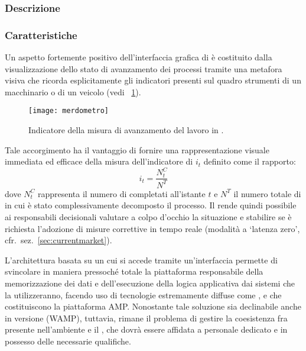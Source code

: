 \subsubsection{Descrizione}

\subsubsection{Caratteristiche}
Un aspetto fortemente positivo dell'interfaccia grafica di \progname è costituito dalla visualizzazione dello stato di avanzamento dei processi tramite una metafora visiva che ricorda esplicitamente gli indicatori presenti sul quadro strumenti di un macchinario o di un veicolo (vedi \figurename~\ref{fig:merdometro}).

\begin{figure}[H]
  \centering
  \texttt{[image: merdometro]}
  \caption{Indicatore della misura di avanzamento del lavoro in \progname.}
  \label{fig:merdometro}
\end{figure}

Tale accorgimento ha il vantaggio di fornire una rappresentazione visuale immediata ed efficace della misura dell'indicatore di  $i_{t}$ definito come il rapporto:
\[
i_{t} = \frac{N^{C}_{t}}{N^{T}}
\]
dove $N^{C}_{t}$ rappresenta il numero di  completati all'istante $t$ e $N^{T}$ il numero totale di  in cui è stato complessivamente decomposto il processo. Il \sw rende quindi possibile ai responsabili decisionali valutare a colpo d'occhio la situazione e stabilire se è richiesta l'adozione di misure correttive in tempo reale (modalità a `latenza zero', cfr.~sez.~\ref{sec:currentmarket}).

L'architettura basata su un  cui si accede tramite un'interfaccia  permette di svincolare in maniera pressoché totale la piattaforma \sw responsabile della memorizzazione dei dati e dell'esecuzione della logica applicativa dai sistemi  che la utilizzeranno, facendo uso di tecnologie estremamente diffuse come ,  e  che costituiscono la piattaforma AMP\@. Nonostante tale soluzione sia declinabile anche in versione  (WAMP), tuttavia, rimane il problema di gestire la coesistenza fra  presente nell'ambiente  e il  , che dovrà essere affidata a personale dedicato e in possesso delle necessarie qualifiche.

